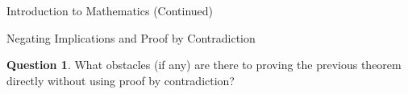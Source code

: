 \documentclass[11pt]{article}
\theoremstyle{definition}
\newtheorem{question}[theorem]{Question}
\begin{document}
\begin{section}{Introduction to Mathematics (Continued)}
\begin{subsection}{Negating Implications and Proof by Contradiction}
\begin{question}
What obstacles (if any) are there to proving the previous theorem directly without using proof by contradiction?
\end{question}

\end{subsection}

\end{section}
\end{document}
